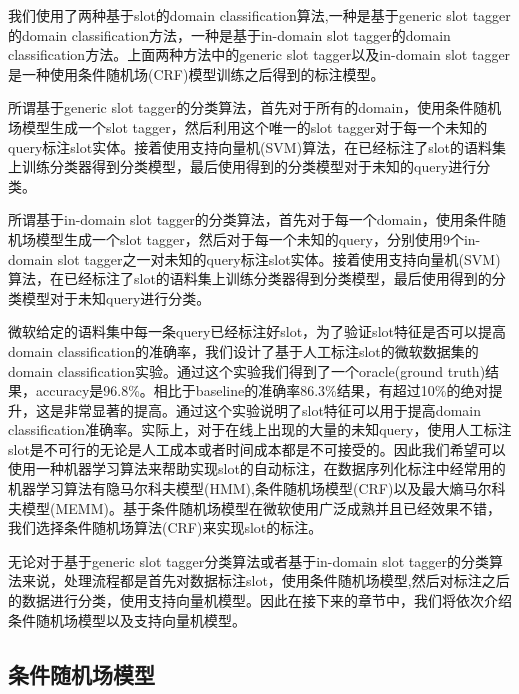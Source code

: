 \documentclass[master]{njuthesis}
\begin{document}
    我们使用了两种基于slot的domain classification算法,一种是基于generic slot tagger的domain classification方法，一种是基于in-domain slot tagger的domain classification方法。上面两种方法中的generic slot tagger以及in-domain slot tagger是一种使用条件随机场(CRF)模型训练之后得到的标注模型。
    
    所谓基于generic slot tagger的分类算法，首先对于所有的domain，使用条件随机场模型生成一个slot tagger，然后利用这个唯一的slot tagger对于每一个未知的query标注slot实体。接着使用支持向量机(SVM)算法，在已经标注了slot的语料集上训练分类器得到分类模型，最后使用得到的分类模型对于未知的query进行分类。

    所谓基于in-domain slot tagger的分类算法，首先对于每一个domain，使用条件随机场模型生成一个slot tagger，然后对于每一个未知的query，分别使用9个in-domain slot tagger之一对未知的query标注slot实体。接着使用支持向量机(SVM)算法，在已经标注了slot的语料集上训练分类器得到分类模型，最后使用得到的分类模型对于未知query进行分类。
    
    微软给定的语料集中每一条query已经标注好slot，为了验证slot特征是否可以提高domain classification的准确率，我们设计了基于人工标注slot的微软数据集的domain classification实验。通过这个实验我们得到了一个oracle(ground truth)结果，accuracy是96.8\%。相比于baseline的准确率86.3\%结果，有超过10\%的绝对提升，这是非常显著的提高。通过这个实验说明了slot特征可以用于提高domain classification准确率。实际上，对于在线上出现的大量的未知query，使用人工标注slot是不可行的无论是人工成本或者时间成本都是不可接受的。因此我们希望可以使用一种机器学习算法来帮助实现slot的自动标注，在数据序列化标注中经常用的机器学习算法有隐马尔科夫模型(HMM),条件随机场模型(CRF)以及最大熵马尔科夫模型(MEMM)。基于条件随机场模型在微软使用广泛成熟并且已经效果不错，我们选择条件随机场算法(CRF)来实现slot的标注。
    
    无论对于基于generic slot tagger分类算法或者基于in-domain slot tagger的分类算法来说，处理流程都是首先对数据标注slot，使用条件随机场模型,然后对标注之后的数据进行分类，使用支持向量机模型。因此在接下来的章节中，我们将依次介绍条件随机场模型以及支持向量机模型。

\subsection{条件随机场模型}
\end{document}
